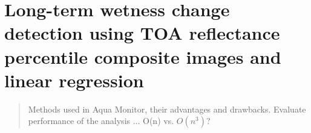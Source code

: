 \chapter{Long-term wetness change detection using TOA reflectance percentile composite images and linear regression}
\label{ch3}

\begin{abstract}
Methods used in Aqua Monitor, their advantages and drawbacks. Evaluate performance of the analysis ... O(n) vs. $O(n^3)$?
\end{abstract}

\newpage

